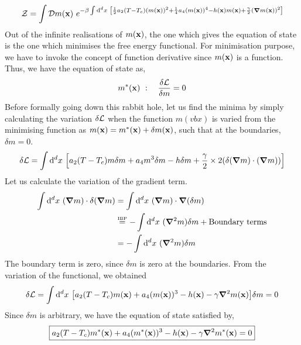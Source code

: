 \begin{equation}
    \SZ = \int \SD m(\vb{x})\ e^{-\beta  \int \dd^d x \ \qty[\frac{1}{2}a_2(T-T_c)(m(\vb{x}))^2 + \frac{1}{4}a_4 (m(\vb{x}))^4 - h(\vb{x})m(\vb{x}) +\frac{\gamma}{2}\qty(\grad m(\vb{x}))^2]}
\end{equation}
Out of the infinite realisations of $m(\vb{x})$, the one which gives the equation of state is the one which minimises the free energy functional. For minimisation purpose, we have to invoke the concept of function derivative since $m(\vb{x})$ is a function. Thus, we have the equation of state as, 
$$m^*(\vb{x})\ : \quad \frac{\delta \mathcal L}{\delta m} = 0$$
Before formally going down this rabbit hole, let us find the minima by simply calculating the variation $\delta \mathcal L$ when the function $m(vb{x})$ is varied from the minimising function as $m(\vb{x}) = m^*(\vb{x}) + \delta m (\vb{x})$, such that at the boundaries, $\delta m =0$.
\begin{align*}
    \delta \mathcal L = \int \dd^dx\ \qty[a_2(T-T_c)m\delta m + a_4 m^3 \delta m - h \delta m + \frac{\gamma}{2}\times 2\qty(\delta(\grad m)\cdot (\grad m))]
\end{align*}
Let us calculate the variation of the gradient term.
\begin{align*}
    \int \dd^dx \ (\grad m ) \cdot \delta (\grad m) &=  \int \dd^dx \ (\grad m ) \cdot \grad( \delta m) \\ 
    &\stackrel{\text{\tiny IBP}}{=} - \int \dd^dx \ (\grad^2 m )  \delta m + \text{Boundary terms}\\
    &=- \int \dd^dx \ (\grad^2 m )  \delta m
\end{align*}
The boundary term is zero, since $\delta m$ is zero at the boundaries. From the variation of the functional, we obtained 
$$\delta\SL = \int \dd^dx \ \qty[a_2(T-T_c)m(\vb{x})+a_4(m(\vb{x}))^3-h(\vb{x})-\gamma \grad^2m(\vb{x})] \delta m = 0$$
Since $\delta m$ is arbitrary, we have the equation of state satisfied by, 
$$\boxed{a_2(T-T_c)m^*(\vb{x})+a_4(m^*(\vb{x}))^3-h(\vb{x})-\gamma \grad^2m^*(\vb{x})=0}$$